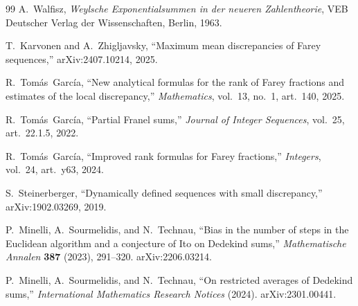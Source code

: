 \documentclass[11pt]{article}
\theoremstyle{definition}
\begin{document}
\begin{thebibliography}{99}
A.~Walfisz,
\emph{Weylsche Exponentialsummen in der neueren Zahlentheorie},
VEB Deutscher Verlag der Wissenschaften, Berlin, 1963.

T.~Karvonen and A.~Zhigljavsky,
``Maximum mean discrepancies of Farey sequences,''
arXiv:2407.10214, 2025.

R.~Tom\'as~Garc\'ia,
``New analytical formulas for the rank of Farey fractions and
estimates of the local discrepancy,''
\emph{Mathematics}, vol.~13, no.~1, art.~140, 2025.

R.~Tom\'as~Garc\'ia,
``Partial Franel sums,''
\emph{Journal of Integer Sequences}, vol.~25, art.~22.1.5, 2022.

R.~Tom\'as~Garc\'ia,
``Improved rank formulas for Farey fractions,''
\emph{Integers}, vol.~24, art.~y63, 2024.

S.~Steinerberger,
``Dynamically defined sequences with small discrepancy,''
arXiv:1902.03269, 2019.

P.~Minelli, A.~Sourmelidis, and N.~Technau,
``Bias in the number of steps in the Euclidean algorithm
and a conjecture of Ito on Dedekind sums,''
\emph{Mathematische Annalen} \textbf{387} (2023), 291--320.
arXiv:2206.03214.

P.~Minelli, A.~Sourmelidis, and N.~Technau,
``On restricted averages of Dedekind sums,''
\emph{International Mathematics Research Notices} (2024).
arXiv:2301.00441.

\end{thebibliography}
\end{document}
